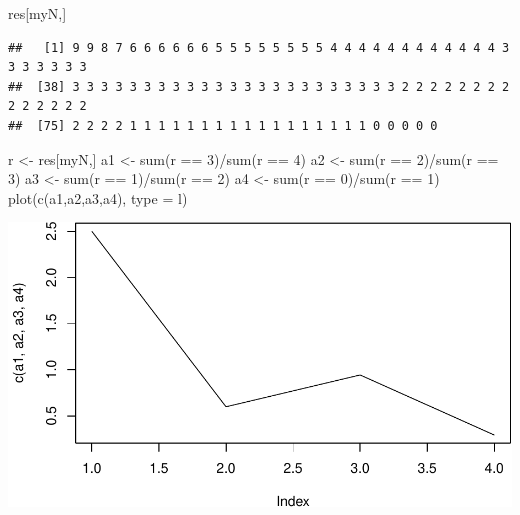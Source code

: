 \documentclass[
]{article}
\newenvironment{Shaded}{\begin{snugshade}}{\end{snugshade}}
\newcommand{\AttributeTok}[1]{\textcolor[rgb]{0.77,0.63,0.00}{#1}}
\newcommand{\DecValTok}[1]{\textcolor[rgb]{0.00,0.00,0.81}{#1}}
\newcommand{\FunctionTok}[1]{\textcolor[rgb]{0.00,0.00,0.00}{#1}}
\newcommand{\NormalTok}[1]{#1}
\newcommand{\OtherTok}[1]{\textcolor[rgb]{0.56,0.35,0.01}{#1}}
\newcommand{\SpecialCharTok}[1]{\textcolor[rgb]{0.00,0.00,0.00}{#1}}
\newcommand{\StringTok}[1]{\textcolor[rgb]{0.31,0.60,0.02}{#1}}
\begin{document}
\begin{Shaded}
\begin{Highlighting}[]
\NormalTok{res[myN,]}
\end{Highlighting}
\end{Shaded}

\begin{verbatim}
##   [1] 9 9 8 7 6 6 6 6 6 6 5 5 5 5 5 5 5 5 4 4 4 4 4 4 4 4 4 4 4 4 3 3 3 3 3 3 3
##  [38] 3 3 3 3 3 3 3 3 3 3 3 3 3 3 3 3 3 3 3 3 3 3 3 2 2 2 2 2 2 2 2 2 2 2 2 2 2
##  [75] 2 2 2 2 1 1 1 1 1 1 1 1 1 1 1 1 1 1 1 1 1 0 0 0 0 0
\end{verbatim}

\begin{Shaded}
\begin{Highlighting}[]
\NormalTok{r }\OtherTok{\textless{}{-}}\NormalTok{ res[myN,]}
\NormalTok{a1 }\OtherTok{\textless{}{-}} \FunctionTok{sum}\NormalTok{(r }\SpecialCharTok{==} \DecValTok{3}\NormalTok{)}\SpecialCharTok{/}\FunctionTok{sum}\NormalTok{(r }\SpecialCharTok{==} \DecValTok{4}\NormalTok{)}
\NormalTok{a2 }\OtherTok{\textless{}{-}} \FunctionTok{sum}\NormalTok{(r }\SpecialCharTok{==} \DecValTok{2}\NormalTok{)}\SpecialCharTok{/}\FunctionTok{sum}\NormalTok{(r }\SpecialCharTok{==} \DecValTok{3}\NormalTok{)}
\NormalTok{a3 }\OtherTok{\textless{}{-}} \FunctionTok{sum}\NormalTok{(r }\SpecialCharTok{==} \DecValTok{1}\NormalTok{)}\SpecialCharTok{/}\FunctionTok{sum}\NormalTok{(r }\SpecialCharTok{==} \DecValTok{2}\NormalTok{)}
\NormalTok{a4 }\OtherTok{\textless{}{-}} \FunctionTok{sum}\NormalTok{(r }\SpecialCharTok{==} \DecValTok{0}\NormalTok{)}\SpecialCharTok{/}\FunctionTok{sum}\NormalTok{(r }\SpecialCharTok{==} \DecValTok{1}\NormalTok{)}
\FunctionTok{plot}\NormalTok{(}\FunctionTok{c}\NormalTok{(a1,a2,a3,a4), }\AttributeTok{type =} \StringTok{\textquotesingle{}l\textquotesingle{}}\NormalTok{)}
\end{Highlighting}
\end{Shaded}

\includegraphics{examples_files/figure-latex/unnamed-chunk-2-5.pdf}
\end{document}
